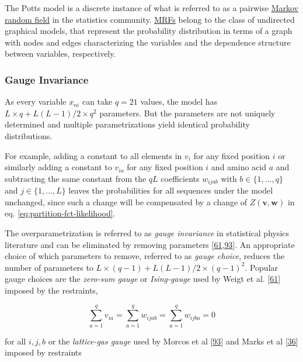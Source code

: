 \documentclass[11pt,a4paper,twoside]{book}
\renewcommand{\v}{\mathbf{v}}
\newcommand{\via}{v_{ia}}
\newcommand{\w}{\mathbf{w}}
\newcommand{\wijab}{w_{ijab}}
\theoremstyle{definition}
\theoremstyle{definition}
\theoremstyle{remark}
\begin{document}
The Potts model is a discrete instance of what is referred to as a
pairwise \protect\hyperlink{abbrev}{Markov random field} in the
statistics community. \protect\hyperlink{abbrev}{MRFs} belong to the
class of undirected graphical models, that represent the probability
distribution in terms of a graph with nodes and edges characterizing the
variables and the dependence structure between variables, respectively.

\subsubsection{Gauge Invariance}\label{gauge-invariance}

As every variable \(x_{ni}\) can take \(q=21\) values, the model has
\(L \! \times \! q + L(L-1)/2 \! \times \! q^2\) parameters. But the
parameters are not uniquely determined and multiple parametrizations
yield identical probability distributions.

For example, adding a constant to all elements in \(v_i\) for any fixed
position \(i\) or similarly adding a constant to \(\via\) for any fixed
position \(i\) and amino acid \(a\) and subtracting the same constant
from the \(qL\) coefficients \(\wijab\) with \(b \in \{1, \ldots, q\}\)
and \(j \in \{1, \ldots, L \}\) leaves the probabilities for all
sequences under the model unchanged, since such a change will be
compensated by a change of \(Z(\v, \w)\) in eq.
\eqref{eq:partition-fct-likelihood}.

The overparametrization is referred to as \emph{gauge invariance} in
statistical physics literature and can be eliminated by removing
parameters
{[}\protect\hyperlink{ref-Weigt2009}{61},\protect\hyperlink{ref-Morcos2011}{93}{]}.
An appropriate choice of which parameters to remove, referred to as
\emph{gauge choice}, reduces the number of parameters to
\(L \! \times \! (q-1) + L(L-1)/2 \! \times \! (q-1)^2\). Popular gauge
choices are the \emph{zero-sum gauge} or \emph{Ising-gauge} used by
Weigt et al. {[}\protect\hyperlink{ref-Weigt2009}{61}{]} imposed by the
restraints,

\begin{equation}
    \sum_{a=1}^{q} v_{ia} = \sum_{a=1}^{q} \wijab = \sum_{a=1}^{q} w_{ijba} = 0
\label{eq:zero-sum-gauge}
\end{equation}

for all \(i,j,b\) or the \emph{lattice-gas gauge} used by Morcos et al
{[}\protect\hyperlink{ref-Morcos2011}{93}{]} and Marks et al
{[}\protect\hyperlink{ref-Marks2011}{36}{]} imposed by restraints
\end{document}
